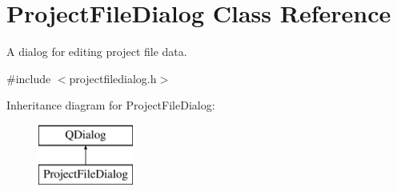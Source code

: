 \hypertarget{class_project_file_dialog}{\section{Project\-File\-Dialog Class Reference}
\label{class_project_file_dialog}
}


A dialog for editing project file data.  




{\ttfamily \#include $<$projectfiledialog.\-h$>$}

Inheritance diagram for Project\-File\-Dialog\-:\begin{figure}[H]
\begin{center}
\leavevmode
\includegraphics[height=2.000000cm]{class_project_file_dialog}
\end{center}
\end{figure}
